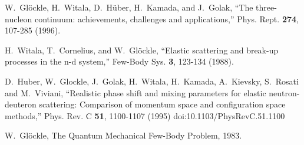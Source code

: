 \documentclass[11pt,aps]{revtex4}
\begin{document}
\begin{thebibliography}{99}

W.~Gl\"ockle, H.~Witala, D.~H\"uber, H.~Kamada, and J.~Golak,
``The three-nucleon continuum: achievements, challenges and applications,'' Phys. Rept. \textbf{274}, 107-285 (1996).

H.~Witala, T.~Cornelius, and W.~Gl\"ockle,
``Elastic scattering and break-up processes in the n-d system,''
Few-Body Sys. \textbf{3}, 123-134 (1988).

D.~Huber, W.~Glockle, J.~Golak, H.~Witala, H.~Kamada, A.~Kievsky, S.~Rosati and M.~Viviani,
``Realistic phase shift and mixing parameters for elastic neutron-deuteron scattering: Comparison of momentum space and configuration space methods,''
Phys. Rev. C \textbf{51}, 1100-1107 (1995)
doi:10.1103/PhysRevC.51.1100

W.~Gl\"ockle,
The Quantum Mechanical Few-Body Problem,
1983.

\end{thebibliography}
\end{document}
